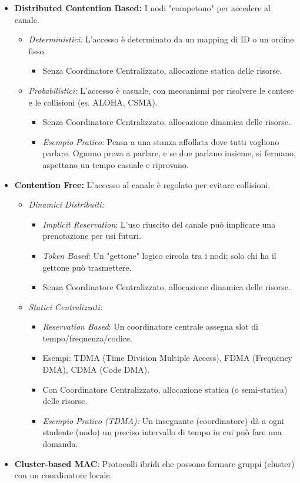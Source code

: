 \begin{itemize}
    \item \textbf{Distributed Contention Based:} I nodi "competono" per accedere al canale.
    \begin{itemize}
        \item \textit{Deterministici:} L'accesso è determinato da un mapping di ID o un ordine fisso.
        \begin{itemize}
            \item Senza Coordinatore Centralizzato, allocazione statica delle risorse.
        \end{itemize}
        \item \textit{Probabilistici:} L'accesso è casuale, con meccanismi per risolvere le contese e le collisioni (es. ALOHA, CSMA).
        \begin{itemize}
            \item Senza Coordinatore Centralizzato, allocazione dinamica delle risorse.
            \item \textit{Esempio Pratico:} Pensa a una stanza affollata dove tutti vogliono parlare. Ognuno prova a parlare, e se due parlano insieme, si fermano, aspettano un tempo casuale e riprovano.
        \end{itemize}
    \end{itemize}
    \item \textbf{Contention Free:} L'accesso al canale è regolato per evitare collisioni.
    \begin{itemize}
        \item \textit{Dinamici Distribuiti:}
        \begin{itemize}
            \item \textit{Implicit Reservation}: L'uso riuscito del canale può implicare una prenotazione per usi futuri.
            \item \textit{Token Based}: Un "gettone" logico circola tra i nodi; solo chi ha il gettone può trasmettere.
            \item Senza Coordinatore Centralizzato, allocazione dinamica delle risorse.
        \end{itemize}
        \item \textit{Statici Centralizzati:}
        \begin{itemize}
            \item \textit{Reservation Based}: Un coordinatore centrale assegna slot di tempo/frequenza/codice.
            \item Esempi: TDMA (Time Division Multiple Access), FDMA (Frequency DMA), CDMA (Code DMA).
            \item Con Coordinatore Centralizzato, allocazione statica (o semi-statica) delle risorse.
            \item \textit{Esempio Pratico (TDMA):} Un insegnante (coordinatore) dà a ogni studente (nodo) un preciso intervallo di tempo in cui può fare una domanda.
        \end{itemize}
    \end{itemize}
    \item \textbf{Cluster-based MAC}: Protocolli ibridi che possono formare gruppi (cluster) con un coordinatore locale.
\end{itemize}


